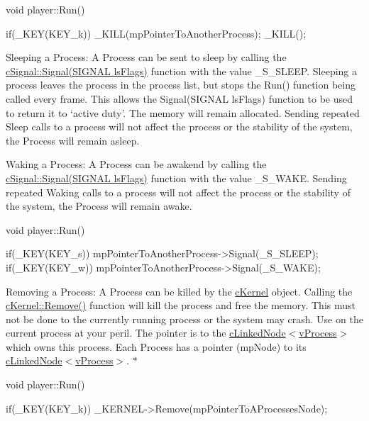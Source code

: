 \begin{DoxyCode}
 void player::Run()
 {

 if(_KEY(KEY_k))
 {
 _KILL(mpPointerToAnotherProcess);
 _KILL();
 }

 }
\end{DoxyCode}


Sleeping a Process: A Process can be sent to sleep by calling the \hyperlink{classc_signal_a77af8271fc7ffb8696ba73a01e213808}{cSignal::Signal(SIGNAL lsFlags)} function with the value \_\-S\_\-SLEEP. Sleeping a process leaves the process in the process list, but stops the Run() function being called every frame. This allows the Signal(SIGNAL lsFlags) function to be used to return it to ‘active duty’. The memory will remain allocated. Sending repeated Sleep calls to a process will not affect the process or the stability of the system, the Process will remain asleep.

Waking a Process: A Process can be awakend by calling the \hyperlink{classc_signal_a77af8271fc7ffb8696ba73a01e213808}{cSignal::Signal(SIGNAL lsFlags)} function with the value \_\-S\_\-WAKE. Sending repeated Waking calls to a process will not affect the process or the stability of the system, the Process will remain awake. 
\begin{DoxyCode}
 void player::Run()
 {

 if(_KEY(KEY_s)) mpPointerToAnotherProcess->Signal(_S_SLEEP);
 if(_KEY(KEY_w)) mpPointerToAnotherProcess->Signal(_S_WAKE);

 }
\end{DoxyCode}


Removing a Process: A Process can be killed by the \hyperlink{classc_kernel}{cKernel} object. Calling the \hyperlink{classc_kernel_a59c9a956e6a6666a57c2d85e463381d8}{cKernel::Remove()} function will kill the process and free the memory. This must not be done to the currently running process or the system may crash. Use on the current process at your peril. The pointer is to the \hyperlink{classc_linked_node}{cLinkedNode$<$vProcess$>$} which owns this process. Each Process has a pointer (mpNode) to its \hyperlink{classc_linked_node}{cLinkedNode$<$vProcess$>$}. $\ast$ 
\begin{DoxyCode}
 void player::Run()
 {

 if(_KEY(KEY_k)) _KERNEL->Remove(mpPointerToAProcessesNode);

 }
\end{DoxyCode}
 